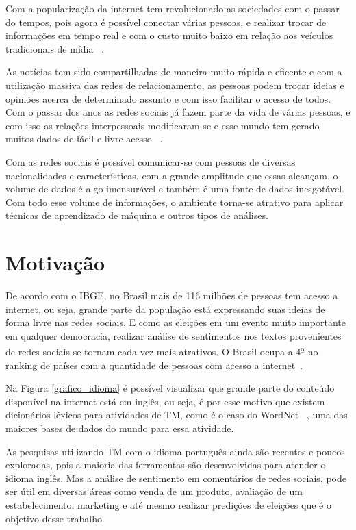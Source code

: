 Com a popularização da internet tem revolucionado as sociedades com o passar do tempos,
pois agora é possível conectar várias pessoas, e realizar trocar de informações em tempo real
e com o custo muito baixo em relação aos veículos tradicionais de mídia ~\cite{song2014analyzing}. 

As notícias tem sido compartilhadas de maneira muito rápida e eficente e com a utilização massiva das 
redes de relacionamento, as pessoas podem trocar ideias e opiniões acerca de determinado assunto e com isso facilitar
o acesso de todos. Com o passar dos anos as redes sociais já fazem parte da vida de várias pessoas, e com isso as relações 
interpessoais modificaram-se e esse mundo tem gerado muitos dados de fácil e livre acesso ~\cite{5194581}.

Com as redes sociais é possível comunicar-se com pessoas de diversas nacionalidades e características, com
a grande amplitude que essas alcançam, o volume de dados é algo imensurável e também é uma fonte de dados
inesgotável. Com todo esse volume de informações, o ambiente torna-se atrativo para aplicar técnicas de aprendizado de
máquina e outros tipos de análises.
\section{Motivação}

De acordo com o \acrshort{IBGE}, no Brasil mais de 116 milhões de pessoas tem acesso a internet, ou seja, grande parte da população está expressando suas ideias
de forma livre nas redes sociais. E como as eleições em um evento muito importante em qualquer democracia, realizar análise de sentimentos nos textos 
provenientes de redes sociais se tornam cada vez mais atrativos. O Brasil ocupa a 4\textsuperscript{\b{a}} no ranking de países com a quantidade de pessoas com acesso a internet~\cite{ILS}.

Na Figura \ref{grafico_idioma} é possível visualizar que grande parte do conteúdo disponível na internet está em inglês, ou seja, é por esse motivo que
existem dicionários léxicos para atividades de \acrshort{TM}, como é o caso do WordNet ~\cite{miller1995wordnet}, uma das maiores bases de dados do mundo para essa atividade. 

As pesquisas utilizando \acrshort{TM} com o idioma português ainda são recentes e poucos exploradas, pois a maioria das ferramentas são desenvolvidas para atender o idioma inglês. Mas a análise
de sentimento em comentários de redes sociais, pode ser útil em diversas áreas como venda de um produto, avaliação de um estabelecimento, marketing e até mesmo realizar predições de eleições que é o objetivo desse trabalho.


